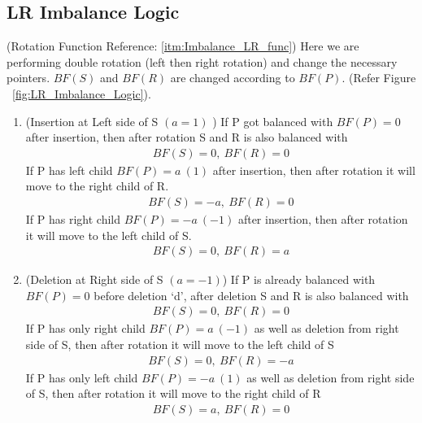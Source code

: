 \documentclass{article}
\begin{document}
\subsection{LR Imbalance Logic}
\label{LR_Imb_op_logic}
(Rotation Function Reference: \ref{itm:Imbalance_LR_func})
Here we are performing double rotation (left then right rotation) and change the necessary pointers. $BF(S)$ and $BF(R)$ are changed according to $BF(P)$. (Refer Figure ~\ref{fig:LR_Imbalance_Logic}).
    \begin{enumerate}
        \item (Insertion at Left side of S $(a=1)$ )\newline
        If P got balanced with $BF(P)=0$ after insertion, then after rotation S and R is also balanced with 
        \begin{align}
            BF(S)=0, \: BF(R)=0
        \end{align}
        If P has left child $BF(P)=a \:(1)$ after insertion, then after rotation it will move to the right child of R.
        \begin{align}
            BF(S)=-a, \: BF(R)=0
        \end{align}
        If P has right child $BF(P)=-a \: (-1)$ after insertion, then after rotation it will move to the left child of S.
         \begin{align}
            BF(S)=0, \: BF(R)=a
        \end{align}
        
        \item (Deletion at Right side of S $(a=-1)$) \newline
        If P is already balanced with $BF(P)=0$ before deletion `d', after deletion S and R is also balanced with 
        \begin{align}
            BF(S)=0, \: BF(R)=0
        \end{align}
        If P has only right child $BF(P)=a \: (-1)$ as well as deletion from right side of S, then after rotation it will move to the left child of S
       \begin{align}
            BF(S)=0, \: BF(R)=-a
        \end{align}
        If P has only left child $BF(P)=-a \: (1)$ as well as deletion from right side of S, then after rotation it will move to the right child of R  
        \begin{align}
            BF(S)=a, \: BF(R)=0
        \end{align}
    \end{enumerate}
\end{document}
